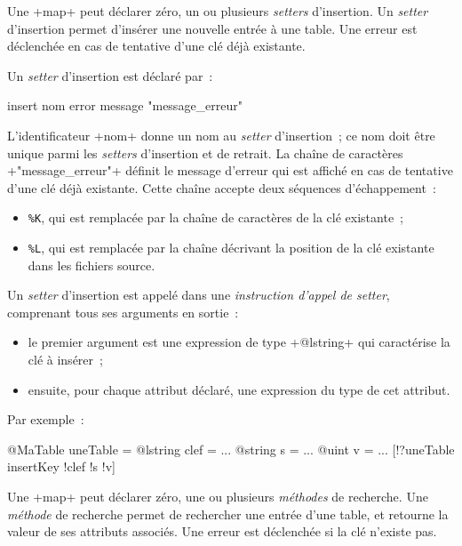 
Une \ggs+map+ peut déclarer zéro, un ou plusieurs \emph{setters} d'insertion. Un \emph{setter} d'insertion permet d'insérer une nouvelle entrée à une table. Une erreur est déclenchée en cas de tentative d'une clé déjà existante.


Un \emph{setter} d'insertion est déclaré par~:

\begin{galgas}
insert nom error message "message_erreur"
\end{galgas}

L'identificateur \ggs+nom+ donne un nom au \emph{setter} d'insertion~; ce nom doit être unique parmi les \emph{setters} d'insertion et de retrait. La chaîne de caractères \ggs+"message_erreur"+ définit le message d'erreur qui est affiché en cas de tentative d'une clé déjà existante. Cette chaîne accepte deux séquences d'échappement~:
\begin{itemize}
  \item \texttt{\%K}, qui est remplacée par la chaîne de caractères de la clé existante~;
  \item \texttt{\%L}, qui est remplacée par la chaîne décrivant la position de la clé existante dans les fichiers source.
\end{itemize}


Un \emph{setter} d'insertion est appelé dans une \emph{instruction d'appel de setter}, comprenant tous ses arguments en sortie~:
\begin{itemize}
  \item le premier argument est une expression de type \ggs+@lstring+ qui caractérise la clé à insérer~;
  \item ensuite, pour chaque attribut déclaré, une expression du type de cet attribut.
\end{itemize}

Par exemple~:
\begin{galgas}
@MaTable uneTable = {}
@lstring clef = ...
@string s = ...
@uint v = ...
[!?uneTable insertKey !clef !s !v]
\end{galgas}












Une \ggs+map+ peut déclarer zéro, une ou plusieurs \emph{méthodes} de recherche. Une \emph{méthode} de recherche permet de rechercher une entrée d'une table, et retourne la valeur de ses attributs associés. Une erreur est déclenchée si la clé n'existe pas.


